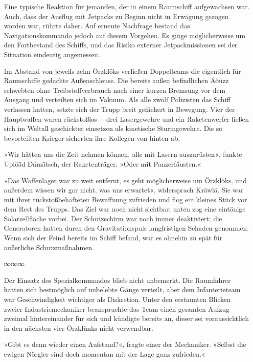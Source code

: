 Eine typische Reaktion für jemanden, der in einem Raumschiff aufgewachsen war. Auch, dass der Ausflug mit Jetpacks zu Beginn nicht in Erwägung gezogen worden war, rührte daher. Auf erneute Nachfrage bestand das Navigationskommando jedoch auf diesem Vorgehen. Es ginge möglicherweise um den Fortbestand des Schiffs, und das Risiko externer Jetpackmissionen sei der Situation eindeutig angemessen.

Im Abstand von jeweils zehn Örzklöks verließen Doppelteams die eigentlich für Raumschiffe gedachte Außenschleuse. Die bereits außen befindlichen Äöüzz schwebten ohne Treibstoffverbrauch nach einer kurzen Bremsung vor dem Ausgang und verteilten sich im Vakuum. Als alle zwölf Polizisten das Schiff verlassen hatten, setzte sich der Trupp breit gefächert in Bewegung. Vier der Hauptwaffen waren rückstoßlos~– drei Lasergewehre und ein Raketenwerfer ließen sich im Weltall geschickter einsetzen als kinetische Sturmgewehre. Die so bevorteilten Krieger sicherten ihre Kollegen von hinten ab.

»Wir hätten uns die Zeit nehmen können, alle mit Lasern auszurüsten«, funkte Üplöäd Dämätsch, der Raketenträger. »Oder mit Panzerfäusten.«

»Das Waffenlager war zu weit entfernt, es geht möglicherweise um Örzklöks, und außerdem wissen wir gar nicht, was uns erwartet«, widersprach Kräwlä. Sie war mit ihrer rückstoßbehafteten Bewaffnung zufrieden und flog ein kleines Stück vor dem Rest des Trupps. Das Ziel war noch nicht sichtbar; unten zog eine eintönige Solarzellfläche vorbei. Der Schutzschirm war noch immer deaktiviert; die Generatoren hatten durch den Gravitationspuls langfristigen Schaden genommen. Wenn sich der Feind bereits im Schiff befand, war es ohnehin zu spät für äußerliche Schutzmaßnahmen.

\begin{center}
∞∞∞
\end{center}

Der Einsatz des Spezialkommandos blieb nicht unbemerkt. Die Raumfahrer hatten sich bestmöglich auf unbelebte Gänge verteilt, aber dem Infanterieteam war Geschwindigkeit wichtiger als Diskretion. Unter den erstaunten Blicken zweier Industriemechaniker beanspruchte das Team einen gesamten Aufzug zweimal hintereinander für sich und kündigte bereits an, dieser sei voraussichtlich in den nächsten vier Örzklünks nicht verwendbar.

»Gibt es denn wieder einen Aufstand?«, fragte einer der Mechaniker. »Selbst die ewigen Nörgler sind doch momentan mit der Lage ganz zufrieden.«

